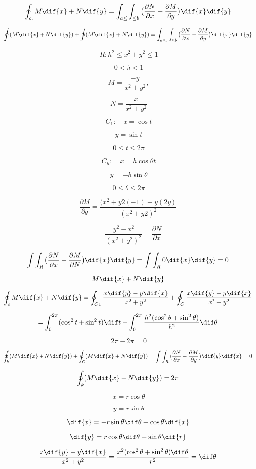 \[ \oint_{c,}M\dif{x}+N\dif{y}= \int_{a\leq}\int_{\leq b}\big(\frac{\partial N}{\partial x}-\frac{\partial M}{\partial y}\big)\dif{x}\dif{y}\]

\[ \oint(M\dif{x}+N\dif{y})+\oint(M\dif{x}+N\dif{y})=\int_{a\leq,}\int_{\leq b}\big(\frac{\partial N}{\partial x}-\frac{\partial M}{\partial y}\big)\dif{x}\dif{y}\]

\[ \ R:h^{2}\leq x^{2}+y^{2}\leq 1 \]

\[ \ 0<h<1\]

\[ \ M=\frac{-y}{x^{2}+y^{2}},\]

\[ \ N= \frac {x}{x^{2}+y^{2}}\]

\[ \ C_{1}: \quad x=\cos t\]

\[\ y=\sin t\]

\[ \ 0\leq t\leq 2\pi \]

\[ \ C_{h}: \quad x=h\cos \theta t\]

\[ \ y= -h\sin \theta \]

\[ \ 0\leq \theta \leq 2\pi \]

\[ \frac{\partial M}{\partial y}=\frac{(x^{2}+y{2}(-1)+y(2y)}{(x^{2}+y{2})^{2}}\]

\[\ = \frac{y^{2}-x^{2}}{(x^{2}+y^{2})^{2}}=\frac{\partial N}{\partial x}\]

\[ \int\int_{R}\big(\frac{\partial N}{\partial x}-\frac{\partial M}{\partial N}\big)\dif{x}\dif{y}=\int\int_{R}0\dif{x}\dif{y}=0\]

\[ M\dif{x}+N\dif{y}\]

\[ \oint_{c}M\dif{x}+N\dif{y}=\oint_{C1}\frac{x\dif{y}-y\dif{x}}{x^{2}+y^{2}}+\oint_{C}\frac{x\dif{y}-y\dif{x}}{x^{2}+y^{2}}\]

\[ = \int_{0}^{2\pi} (\cos^{2}t +\sin^{2}t)\dif t-\int_{0}^{2\pi}\frac{h^{2}(\cos^{2}\theta+\sin^{2}\theta)}{h^{2}}\dif \theta \]

\[ \ 2\pi-2\pi=0\]

\[\oint_{k}(M\dif{x}+N\dif{y})+\oint_{C}(M\dif{x}+N\dif{y})=\int\int_{R}\big(\frac{\partial N}{\partial x}-\frac{\partial M}{\partial y}\big)\dif{y}\dif{x}=0\]

\[ \oint_{k}(M\dif{x}+N\dif{y})=2\pi \]

\[ \ x = r \cos \theta \]

\[ \ y=r \sin \theta \]

\[ \dif{x}=  -r\sin \theta \dif \theta+\cos \theta \dif{x}\]

\[ \dif{y}=  r\cos \theta \dif \theta +\sin \theta \dif{r}\]

\[ \frac{ x\dif{y}-y\dif{x}}{x^{2}+y^{2}}=\frac{x^{2}(\cos^{2}\theta+\sin^{2}\theta)\dif\theta}{r^{2}}=\dif \theta \]

